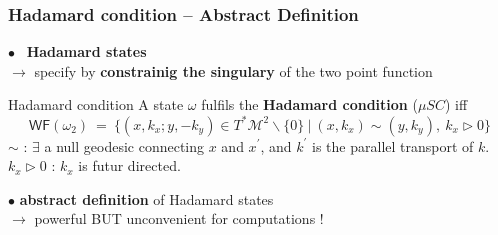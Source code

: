 \documentclass[9pt]{beamer}
\newcommand{\WF}{\mathsf{WF}} %
\newcommand{\Mcal}{\mathcal{M}}
\begin{document}
\begin{frame}

\frametitle{Hadamard condition -- Abstract Definition}

\vfill

$\bullet$ \ \textbf{Hadamard states} \\ 
\qquad $\to$ specify by \textbf{constrainig the singulary} of the two point function

\vfill

\begin{block}{Hadamard condition }
A state $\omega$ fulfils the \textbf{Hadamard condition} ($\mu S C$) iff
\begin{equation*}
 \WF(\omega_{2}) \ = \ \bigg\{ (x,k_x ; y,-k_y) \in T^\ast\Mcal^2 \backslash \{0\} \ \bigg| \ (x,k_x) \sim (y,k_y) , \ k_x \triangleright 0 \bigg\}
\end{equation*}
$\sim$ : $\exists$ a null geodesic connecting $x$ and $x^\prime$, and $k^\prime$ is the parallel transport of $k$. \\
$k_x \triangleright 0$ : $k_x$ is futur directed.
\end{block}

\vfill

$\bullet$ \textbf{abstract definition} of Hadamard states \\
\qquad $\to$ powerful BUT unconvenient for computations !

\vfill

\end{frame} 

\end{document}
